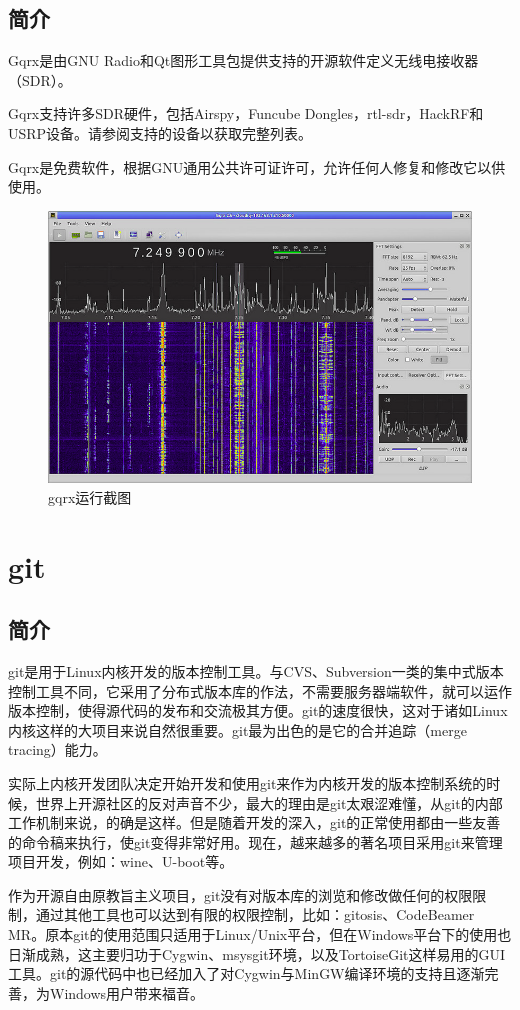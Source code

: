 		\subsection{简介}
			\par Gqrx是由GNU Radio和Qt图形工具包提供支持的开源软件定义无线电接收器（SDR）。
			\par Gqrx支持许多SDR硬件，包括Airspy，Funcube Dongles，rtl-sdr，HackRF和USRP设备。请参阅支持的设备以获取完整列表。
			\par Gqrx是免费软件，根据GNU通用公共许可证许可，允许任何人修复和修改它以供使用。
			\begin{figure}[htb]
				\centering
				\includegraphics[width=13cm]{figures/gqrx.png}
				\caption{gqrx运行截图}
				\label{fig:gqrx运行截图}
			\end{figure}
				
	\section{git}
		\subsection{简介}
			\par git是用于Linux内核开发的版本控制工具。与CVS、Subversion一类的集中式版本控制工具不同，它采用了分布式版本库的作法，不需要服务器端软件，就可以运作版本控制，使得源代码的发布和交流极其方便。git的速度很快，这对于诸如Linux内核这样的大项目来说自然很重要。git最为出色的是它的合并追踪（merge tracing）能力。
			\par 实际上内核开发团队决定开始开发和使用git来作为内核开发的版本控制系统的时候，世界上开源社区的反对声音不少，最大的理由是git太艰涩难懂，从git的内部工作机制来说，的确是这样。但是随着开发的深入，git的正常使用都由一些友善的命令稿来执行，使git变得非常好用。现在，越来越多的著名项目采用git来管理项目开发，例如：wine、U-boot等。
			\par 作为开源自由原教旨主义项目，git没有对版本库的浏览和修改做任何的权限限制，通过其他工具也可以达到有限的权限控制，比如：gitosis、CodeBeamer MR。原本git的使用范围只适用于Linux/Unix平台，但在Windows平台下的使用也日渐成熟，这主要归功于Cygwin、msysgit环境，以及TortoiseGit这样易用的GUI工具。git的源代码中也已经加入了对Cygwin与MinGW编译环境的支持且逐渐完善，为Windows用户带来福音。\cite{ wiki:Git}
